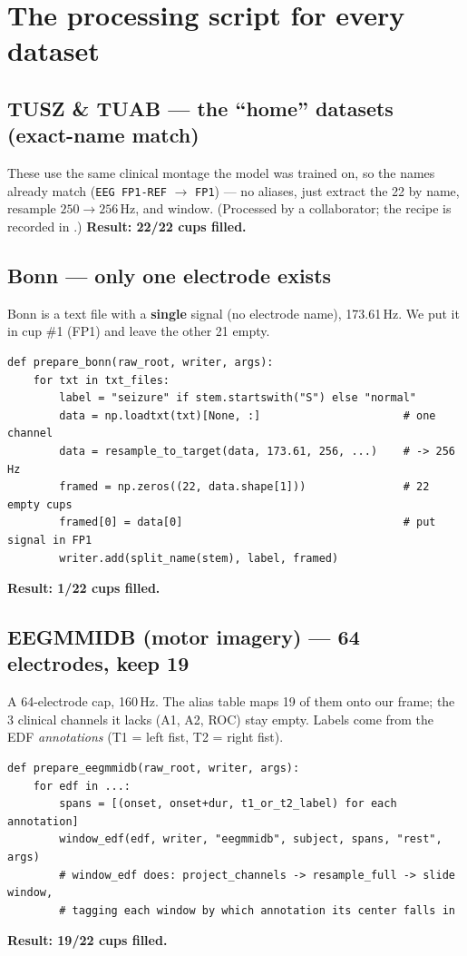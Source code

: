 \documentclass[11pt]{article}
\begin{document}
\section{The processing script for every dataset}

\subsection*{TUSZ \& TUAB --- the ``home'' datasets (exact-name match)}
These use the same clinical montage the model was trained on, so the names
already match (\texttt{EEG FP1-REF} $\rightarrow$ \texttt{FP1}) --- no aliases,
just extract the 22 by name, resample $250\!\rightarrow\!256$\,Hz, and window.
(Processed by a collaborator; the recipe is recorded in
.)
\textbf{Result: 22/22 cups filled.}

\subsection*{Bonn --- only one electrode exists}
Bonn is a text file with a \textbf{single} signal (no electrode name), 173.61\,Hz.
We put it in cup \#1 (FP1) and leave the other 21 empty.
\begin{lstlisting}
def prepare_bonn(raw_root, writer, args):
    for txt in txt_files:
        label = "seizure" if stem.startswith("S") else "normal"
        data = np.loadtxt(txt)[None, :]                      # one channel
        data = resample_to_target(data, 173.61, 256, ...)    # -> 256 Hz
        framed = np.zeros((22, data.shape[1]))               # 22 empty cups
        framed[0] = data[0]                                  # put signal in FP1
        writer.add(split_name(stem), label, framed)
\end{lstlisting}
\textbf{Result: 1/22 cups filled.}

\subsection*{EEGMMIDB (motor imagery) --- 64 electrodes, keep 19}
A 64-electrode cap, 160\,Hz. The alias table maps 19 of them onto our frame;
the 3 clinical channels it lacks (A1, A2, ROC) stay empty. Labels come from the
EDF \emph{annotations} (T1 = left fist, T2 = right fist).
\begin{lstlisting}
def prepare_eegmmidb(raw_root, writer, args):
    for edf in ...:
        spans = [(onset, onset+dur, t1_or_t2_label) for each annotation]
        window_edf(edf, writer, "eegmmidb", subject, spans, "rest", args)
        # window_edf does: project_channels -> resample_full -> slide window,
        # tagging each window by which annotation its center falls in
\end{lstlisting}
\textbf{Result: 19/22 cups filled.}
\end{document}
